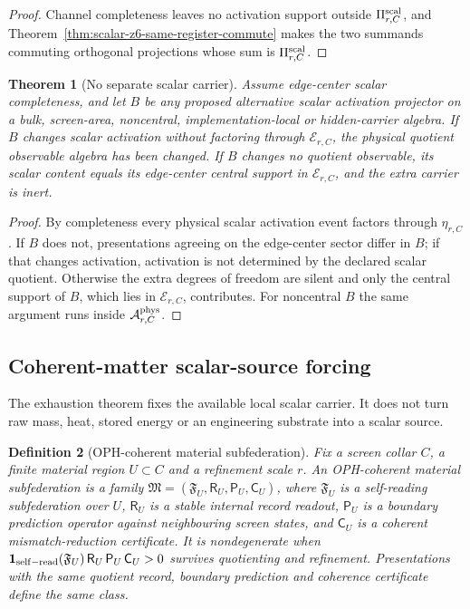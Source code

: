 \documentclass[11pt]{article}
\newtheorem{theorem}{Theorem}[section]
\newtheorem{definition}[theorem]{Definition}
\theoremstyle{remark}
\theoremstyle{plain}
\begin{document}
\begin{proof}
Channel completeness leaves no activation support outside
\(\Pi^{\rm scal}_{r,C}\), and
Theorem~\ref{thm:scalar-z6-same-register-commute} makes the two summands
commuting orthogonal projections whose sum is \(\Pi^{\rm scal}_{r,C}\).
\end{proof}

\begin{theorem}[No separate scalar carrier]
\label{thm:no-separate-scalar-carrier}
Assume edge-center scalar completeness, and let \(B\) be any proposed
alternative scalar activation projector on a bulk, screen-area, noncentral,
implementation-local or hidden-carrier algebra. If \(B\) changes scalar
activation without factoring through \(\mathcal E_{r,C}\), the physical
quotient observable algebra has been changed. If \(B\) changes no quotient
observable, its scalar content equals its edge-center central support in
\(\mathcal E_{r,C}\), and the extra carrier is inert.
\end{theorem}

\begin{proof}
By completeness every physical scalar activation event factors through
\(\eta_{r,C}\). If \(B\) does not, presentations agreeing on the edge-center
sector differ in \(B\); if that changes activation, activation is not
determined by the declared scalar quotient. Otherwise the extra degrees of
freedom are silent and only the central support of \(B\), which lies in
\(\mathcal E_{r,C}\), contributes. For noncentral \(B\) the same argument runs
inside \(\mathcal A^{\rm phys}_{r,C}\).
\end{proof}

\subsection{Coherent-matter scalar-source forcing}
\label{sec:coherent-matter-scalar-source-forcing}

The exhaustion theorem fixes the available local scalar carrier. It does not
turn raw mass, heat, stored energy or an engineering substrate into a scalar
source.

\begin{definition}[OPH-coherent material subfederation]
\label{def:oph-coherent-material-subfederation}
Fix a screen collar \(C\), a finite material region \(U\subset C\) and a
refinement scale \(r\). An OPH-coherent material subfederation is a family
\(\mathfrak M=(\mathfrak F_U,\mathsf R_U,\mathsf P_U,\mathsf C_U)\), where
\(\mathfrak F_U\) is a self-reading subfederation over \(U\), \(\mathsf R_U\)
is a stable internal record readout, \(\mathsf P_U\) is a boundary prediction
operator against neighbouring screen states, and \(\mathsf C_U\) is a
coherent mismatch-reduction certificate. It is nondegenerate when
\(\mathbf 1_{\rm self-read}(\mathfrak F_U)\,\mathsf R_U\,\mathsf P_U\,\mathsf C_U>0\)
survives quotienting and refinement. Presentations with the same quotient
record, boundary prediction and coherence certificate define the same class.
\end{definition}
\end{document}

